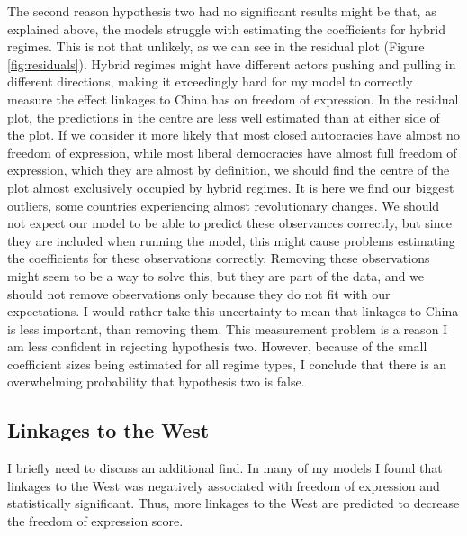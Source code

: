 The second reason hypothesis two had no significant results might be that, as explained above, the models struggle with estimating the coefficients for hybrid regimes. This is not that unlikely, as we can see in the residual plot (Figure \ref{fig:residuals}). Hybrid regimes might have different actors pushing and pulling in different directions, making it exceedingly hard for my model to correctly measure the effect linkages to China has on freedom of expression. In the residual plot, the predictions in the centre are less well estimated than at either side of the plot. If we consider it more likely that most closed autocracies have almost no freedom of expression, while most liberal democracies have almost full freedom of expression, which they are almost by definition, we should find the centre of the plot almost exclusively occupied by hybrid regimes. It is here we find our biggest outliers, some countries experiencing almost revolutionary changes. We should not expect our model to be able to predict these observances correctly, but since they are included when running the model, this might cause problems estimating the coefficients for these observations correctly. Removing these observations might seem to be a way to solve this, but they are part of the data, and we should not remove observations only because they do not fit with our expectations. I would rather take this uncertainty to mean that linkages to China is less important, than removing them. This measurement problem is a reason I am less confident in rejecting hypothesis two. However, because of the small coefficient sizes being estimated for all regime types, I conclude that there is an overwhelming probability that hypothesis two is false. 

\subsection{Linkages to the West}
I briefly need to discuss an additional find.  In many of my models I found that linkages to the West was negatively associated with freedom of expression and statistically significant. Thus, more linkages to the West are predicted to decrease the freedom of expression score.

